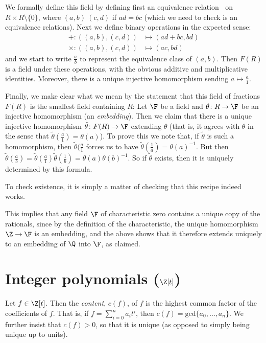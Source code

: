 \documentclass{maths}
\begin{document}
We formally define this field by defining first an equivalence relation $~$ on $R\times R\setminus\{0\}$, where $(a,b)~(c,d)$ if $ad=bc$ (which we need to check is an equivalence relations).
Next we define binary operations in the expected sense:
\begin{align*}
    +\colon((a,b),(c,d))&\mapsto(ad+bc,bd)\\
    \times\colon((a,b),(c,d))&\mapsto(ac,bd)
\end{align*}
and we start to write $\frac{a}{b}$ to represent the equivalence class of $(a,b)$.
Then $F(R)$ is a field under these operations, with the obvious additive and multiplicative identities.
Moreover, there is a unique injective homomorphism sending $a\mapsto\frac{a}{1}$.

Finally, we make clear what we mean by the statement that this field of fractions $F(R)$ is the smallest field containing $R$:
Let $\F$ be a field and $\theta\colon R\to\F$ be an injective homomorphism (an \emph{embedding}).
Then we claim that there is a unique injective homomorphism $\tilde{\theta}\colon F(R)\to\F$ extending $\theta$ (that is, it agrees with $\theta$ in the sense that $\tilde{\theta}(\frac{a}{1})=\theta(a)$).
To prove this we note that, if $\tilde{\theta}$ is such a homomorphism, then $\tilde{\theta}(\frac{a}{1}$ forces us to have $\tilde{\theta}(\frac{1}{a})=\theta(a)^{-1}$.
But then $\tilde{\theta}(\frac{a}{b})=\tilde{\theta}(\frac{a}{1})\tilde{\theta}(\frac{1}{b})=\theta(a)\theta(b)^{-1}$.
So if $\tilde{\theta}$ exists, then it is uniquely determined by this formula.

To check existence, it is simply a matter of checking that this recipe indeed works.

\begin{rem}
    This implies that any field $\F$ of characteristic zero contains a unique copy of the rationals, since by the definition of the characteristic, the unique homomorphism $\Z\to\F$ is an embedding, and the above shows that it therefore extends uniquely to an embedding of $\Q$ into $\F$, as claimed.
\end{rem}

\section{Integer polynomials \texorpdfstring{($\Z[t]$)}{Z[t]}}

\begin{defn}[Content]
    Let $f\in\Z[t]$.
    Then the \emph{content}, $c(f)$, of $f$ is the highest common factor of the coefficients of $f$.
    That is, if $f=\sum_{i=0}^n a_i t^i$, then $c(f)=\mathrm{gcd}\{a_0,\ldots,a_n\}$.
    We further insist that $c(f)>0$, so that it is unique (as opposed to simply being unique up to units).
\end{defn}
\end{document}

